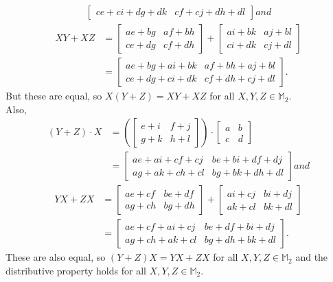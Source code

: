 \begin{enumerate}[(a)]
\begin{enumerate}[(1)]
\begin{align*}
\begin{bmatrix}
ce+ci+dg+dk & cf+cj+dh+dl
\end{bmatrix} and
\end{align*}
\begin{align*}
XY+XZ&=
\begin{bmatrix}
ae+bg & af+bh\\
ce+dg & cf+dh
\end{bmatrix}+
\begin{bmatrix}
ai+bk & aj+bl\\
ci+dk & cj+dl
\end{bmatrix}\\
&=
\begin{bmatrix}
ae+bg+ai+bk & af+bh+aj+bl\\
ce+dg+ci+dk & cf+dh+cj+dl
\end{bmatrix}.
\end{align*}
But these are equal, so $X(Y+Z)=XY+XZ$ for all $X,Y,Z\in{\mathbb M}_2$.\\  
Also,
\begin{align*}
(Y+Z)\cdot X&=\left(
\begin{bmatrix}
e+i & f+j\\
g+k & h+l
\end{bmatrix}
\right)\cdot
\begin{bmatrix}
a & b\\
c & d
\end{bmatrix}\\
&=
\begin{bmatrix}
ae+ai+cf+cj & be+bi+df+dj\\
ag+ak+ch+cl & bg+bk+dh+dl
\end{bmatrix} and
\end{align*}
\begin{align*}
YX+ZX&=
\begin{bmatrix}
ae+cf & be+df\\
ag+ch & bg+dh
\end{bmatrix}+
\begin{bmatrix}
ai+cj & bi+dj\\
ak+cl & bk+dl
\end{bmatrix}\\
&=
\begin{bmatrix}
ae+cf+ai+cj & be+df+bi+dj\\
ag+ch+ak+cl & bg+dh+bk+dl
\end{bmatrix}.
\end{align*}
These are also equal, so $(Y+Z)X=YX+ZX$ for all $X,Y,Z\in{\mathbb M}_2$ and the distributive property holds for all $X,Y,Z\in{\mathbb M}_2$.
\end{enumerate}

\end{enumerate}
